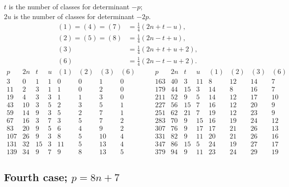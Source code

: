 \documentclass[12pt]{article}
\begin{document}
$t$ is the number of classes for determinant $-p$;\\
$2u$ is the number of classes for determinant $-2p$.
\[
\begin{aligned}
(1)=(4)=(7)&=\frac14(2n+t-u),\\
(2)=(5)=(8)&=\frac14(2n-t+u),\\
(3)&=\frac14(2n+t+u+2),\\
(6)&=\frac14(2n-t-u+2).
\end{aligned}
\]
{\scriptsize
\[
\begin{array}{r|r|r|r|r|r|r|r}
p&2n&t&u&(1)&(2)&(3)&(6)\\\hline
3&0&1&1&0&0&1&0\\
11&2&3&1&1&0&2&0\\
19&4&3&3&1&1&3&0\\
43&10&3&5&2&3&5&1\\
59&14&9&3&5&2&7&1\\
67&16&3&7&3&5&7&2\\
83&20&9&5&6&4&9&2\\
107&26&9&3&8&5&10&4\\
131&32&15&3&11&5&13&4\\
139&34&9&7&9&8&13&5
\end{array}
\qquad
\begin{array}{r|r|r|r|r|r|r|r}
p&2n&t&u&(1)&(2)&(3)&(6)\\\hline
163&40&3&11&8&12&14&7\\
179&44&15&3&14&8&16&7\\
211&52&9&5&14&12&17&10\\
227&56&15&7&16&12&20&9\\
251&62&21&7&19&12&23&9\\
283&70&9&15&16&19&24&12\\
307&76&9&17&17&21&26&13\\
331&82&9&11&20&21&26&16\\
347&86&15&5&24&19&27&17\\
379&94&9&11&23&24&29&19
\end{array}
\]
}

\subsection*{Fourth case; \(p=8n+7\)}
\end{document}
